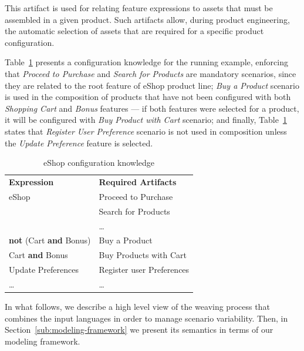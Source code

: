 \documentclass[11pt]{report}
\begin{document}
This artifact is used for relating feature expressions to assets that must be assembled in a given product. Such artifacts allow, during product engineering, the automatic selection of assets that are required for a specific product configuration. 

Table~\ref{tab:ck-running-example} presents a configuration knowledge 
for the running example, enforcing that \emph{Proceed to Purchase} and 
\emph{Search for Products} are mandatory scenarios, since they are related 
to the root feature of eShop product line;  
\emph{Buy a Product} scenario is used in the composition of products that have not been configured with both \emph{Shopping Cart} and \emph{Bonus} features --- if both features were selected for a product, it will be configured with \emph{Buy Product with Cart} scenario; and finally, Table~\ref{tab:ck-running-example} states that \emph{Register User Preference} scenario is not used in composition unless the \emph{Update Preference} feature is selected.


\begin{table}[th]
\begin{center}
 \caption{eShop configuration knowledge}
\label{tab:ck-running-example}
\begin{tabular}{ll}
   \hline\noalign{\smallskip}
  {\bf Expression} & {\bf Required Artifacts} \\
   \noalign{\smallskip}
   \hline
   \noalign{\smallskip}
    eShop & Proceed to Purchase \\
               & Search for Products \\
               & \ldots \\ 
    {\bf not} (Cart {\bf and} Bonus)\hspace{2pt} & Buy a Product \\ 
    Cart {\bf and} Bonus & Buy Products with Cart \\ 
    Update Preferences & Register user Preferences	 \\  
    \ldots & \ldots \\ 
  \hline
\end{tabular}
\end{center}
\end{table}

In what follows, we describe a high level view of the weaving process that combines the input languages in order to manage scenario variability.  Then, in Section~\ref{sub:modeling-framework} we present its semantics in terms of our modeling framework. 
\end{document}
